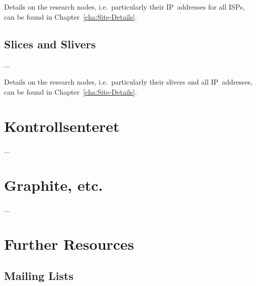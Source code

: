 Details on the research nodes, i.e.\ particularly their IP~addresses for all ISPs, can be found in Chapter~\ref{cha:Site-Details}.


\subsection{Slices and Slivers}
\label{sub:Slices-and-Slivers}

...

Details on the research nodes, i.e.\ particularly their slivers and all IP~addresses, can be found in Chapter~\ref{cha:Site-Details}.



\section{Kontrollsenteret}
\label{sec:Kontrollsenteret}

...



\section{Graphite, etc.}
\label{sec:...}

...



\section{Further Resources}

\subsection{Mailing Lists}

